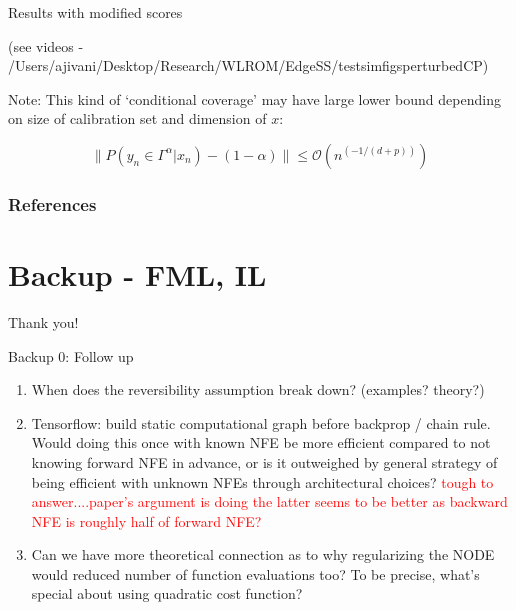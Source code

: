 \documentclass[usenames,dvipsnames]{beamer}
\theoremstyle{definition}
\begin{document}
\begin{frame}{Results with modified scores}

    (see videos - /Users/ajivani/Desktop/Research/WLROM/EdgeSS/test\textunderscore sim\textunderscore figs\textunderscore perturbed\textunderscore CP)

    Note: This kind of `conditional coverage' may have large lower bound depending on size of calibration set and dimension of $x$:

    $$\| P(y_n \in \Gamma^{\alpha} | x_n) - (1 - \alpha)\| \leq \mathcal{O}(n^{(-1/(d + p))})$$

\end{frame}
\begin{frame}[allowframebreaks]
    \frametitle{References}
    

    
\end{frame}

\section{Backup - FML, IL}
\begin{frame}{}
\begin{center}
    \Large{Thank you!}
\end{center}
    
\end{frame}

\begin{frame}{Backup 0: Follow up}
    \begin{enumerate}
    \item When does the reversibility assumption break down? (examples? theory?)
    
    \item Tensorflow: build static computational graph before backprop / chain rule. Would doing this once with known NFE be more efficient compared to not knowing forward NFE in advance, or is it outweighed by general strategy of being efficient with unknown NFEs through architectural choices? \textcolor{red}{tough to answer....paper's argument is doing the latter seems to be better as backward NFE is roughly half of forward NFE?}
    
    \item Can we have more theoretical connection as to why regularizing the NODE would reduced number of function evaluations too? To be precise, what's special about using quadratic cost function?
    \end{enumerate}
\end{frame}
\end{document}

